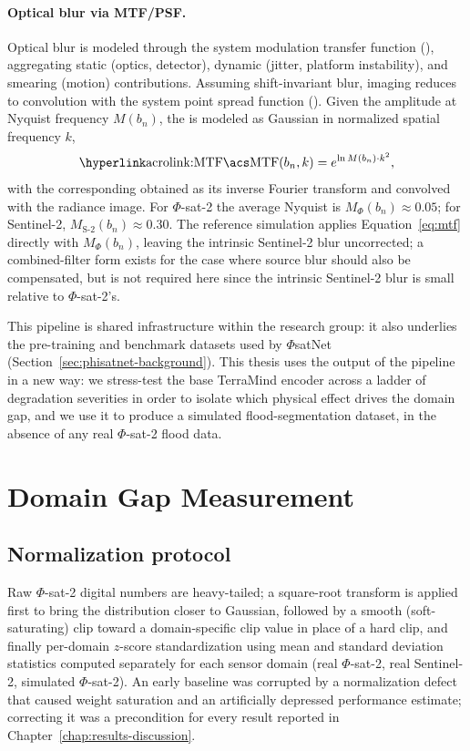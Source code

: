 \paragraph{Optical blur via MTF/PSF.}
Optical blur is modeled through the system modulation transfer function (), aggregating static (optics, detector), dynamic (jitter, platform instability), and smearing (motion) contributions.
Assuming shift-invariant blur, imaging reduces to convolution with the system point spread function ().
Given the  amplitude at Nyquist frequency $M(b_n)$, the  is modeled as Gaussian in normalized spatial frequency $k$,
\begin{equation}
    \text{\acref{MTF}}(b_n, k) = e^{\ln M(b_n) \cdot k^2},
    \label{eq:mtf}
\end{equation}
with the corresponding  obtained as its inverse Fourier transform and convolved with the radiance image.
For $\Phi$-sat-2 the average Nyquist  is $M_\Phi(b_n) \approx 0.05$; for Sentinel-2, $M_{\text{S-2}}(b_n) \approx 0.30$.
The reference simulation applies Equation~\eqref{eq:mtf} directly with $M_\Phi(b_n)$, leaving the intrinsic Sentinel-2 blur uncorrected; a combined-filter form exists for the case where source blur should also be compensated, but is not required here since the intrinsic Sentinel-2 blur is small relative to $\Phi$-sat-2's.

This pipeline is shared infrastructure within the research group: it also underlies the pre-training and benchmark datasets used by $\Phi$satNet (Section~\ref{sec:phisatnet-background}).
This thesis uses the output of the pipeline in a new way: we stress-test the base TerraMind encoder across a ladder of degradation severities in order to isolate which physical effect drives the domain gap, and we use it to produce a simulated flood-segmentation dataset, in the absence of any real $\Phi$-sat-2 flood data.

\section{Domain Gap Measurement}
\label{sec:gap-measurement}

\subsection{Normalization protocol}
\label{sec:normalization}

Raw $\Phi$-sat-2 digital numbers are heavy-tailed; a square-root transform is applied first to bring the distribution closer to Gaussian, followed by a smooth (soft-saturating) clip toward a domain-specific clip value in place of a hard clip, and finally per-domain $z$-score standardization using mean and standard deviation statistics computed separately for each sensor domain (real $\Phi$-sat-2, real Sentinel-2, simulated $\Phi$-sat-2).
An early baseline was corrupted by a normalization defect that caused weight saturation and an artificially depressed performance estimate; correcting it was a precondition for every result reported in Chapter~\ref{chap:results-discussion}.

